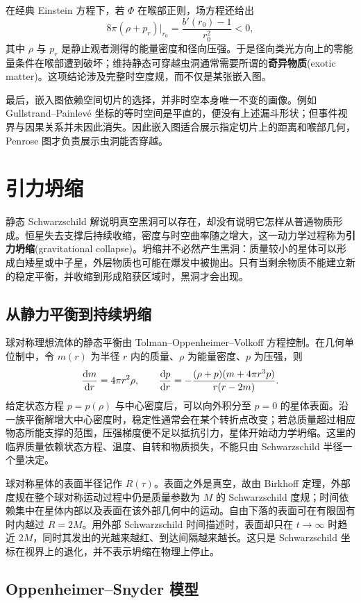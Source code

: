在经典 Einstein 方程下，若 $\Phi$ 在喉部正则，场方程还给出
\[
    8\pi(\rho+p_r)\big|_{r_0}=\frac{b'(r_0)-1}{r_0^2}<0,
\]
其中 $\rho$ 与 $p_r$ 是静止观者测得的能量密度和径向压强。于是径向类光方向上的零能量条件在喉部遭到破坏；维持静态可穿越虫洞通常需要所谓的\textbf{奇异物质}(exotic matter)。这项结论涉及完整时空度规，而不仅是某张嵌入图。

最后，嵌入图依赖空间切片的选择，并非时空本身唯一不变的画像。例如 Gullstrand--Painlevé 坐标的等时空间是平直的，便没有上述漏斗形状；但事件视界与因果关系并未因此消失。因此嵌入图适合展示指定切片上的距离和喉部几何，Penrose 图才负责展示虫洞能否穿越。


\section{引力坍缩}\label{sec:collapse}

静态 Schwarzschild 解说明真空黑洞可以存在，却没有说明它怎样从普通物质形成。恒星失去支撑后持续收缩，密度与时空曲率随之增大，这一动力学过程称为\textbf{引力坍缩}(gravitational collapse)。坍缩并不必然产生黑洞：质量较小的星体可以形成白矮星或中子星，外层物质也可能在爆发中被抛出。只有当剩余物质不能建立新的稳定平衡，并收缩到形成陷获区域时，黑洞才会出现。

\subsection{从静力平衡到持续坍缩}

球对称理想流体的静态平衡由 Tolman--Oppenheimer--Volkoff 方程控制。在几何单位制中，令 $m(r)$ 为半径 $r$ 内的质量、$\rho$ 为能量密度、$p$ 为压强，则
\[
    \dv{m}{r}=4\pi r^2\rho,\qquad
    \dv{p}{r}=-\frac{(\rho+p)(m+4\pi r^3p)}{r(r-2m)}.
\]
给定状态方程 $p=p(\rho)$ 与中心密度后，可以向外积分至 $p=0$ 的星体表面。沿一族平衡解增大中心密度时，稳定性通常会在某个转折点改变；若总质量超过相应物态所能支撑的范围，压强梯度便不足以抵抗引力，星体开始动力学坍缩。这里的临界质量依赖状态方程、温度、自转和物质损失，不能只由 Schwarzschild 半径一个量决定。

球对称星体的表面半径记作 $R(\tau)$。表面之外是真空，故由 Birkhoff 定理，外部度规在整个球对称运动过程中仍是质量参数为 $M$ 的 Schwarzschild 度规；时间依赖集中在星体内部以及表面在该外部几何中的运动。自由下落的表面可在有限固有时内越过 $R=2M$。用外部 Schwarzschild 时间描述时，表面却只在 $t\to\infty$ 时趋近 $2M$，同时其发出的光越来越红、到达间隔越来越长。这只是 Schwarzschild 坐标在视界上的退化，并不表示坍缩在物理上停止。

\subsection{Oppenheimer--Snyder 模型}

